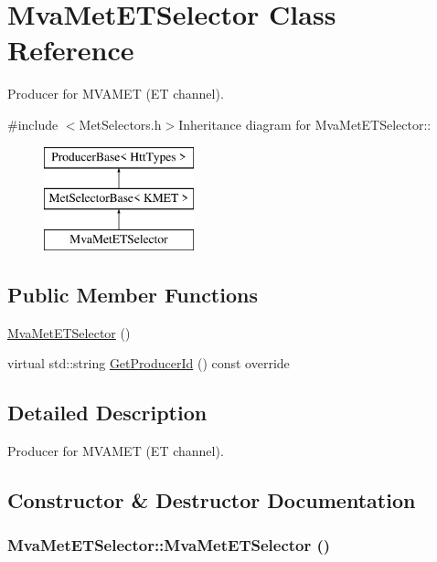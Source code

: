 \hypertarget{classMvaMetETSelector}{
\section{MvaMetETSelector Class Reference}
\label{classMvaMetETSelector}
}


Producer for MVAMET (ET channel).  


{\ttfamily \#include $<$MetSelectors.h$>$}Inheritance diagram for MvaMetETSelector::\begin{figure}[H]
\begin{center}
\leavevmode
\includegraphics[height=3cm]{classMvaMetETSelector}
\end{center}
\end{figure}
\subsection*{Public Member Functions}
\begin{DoxyCompactItemize}
\item 
\hyperlink{classMvaMetETSelector_afe22d385da68fb3ebd28bea8a81d9491}{MvaMetETSelector} ()
\item 
virtual std::string \hyperlink{classMvaMetETSelector_aa0bf0e0f682f9efc2e4b7bf9ae026a5a}{GetProducerId} () const override
\end{DoxyCompactItemize}


\subsection{Detailed Description}
Producer for MVAMET (ET channel). 

\subsection{Constructor \& Destructor Documentation}
\hypertarget{classMvaMetETSelector_afe22d385da68fb3ebd28bea8a81d9491}{
\subsubsection[{MvaMetETSelector}]{\setlength{\rightskip}{0pt plus 5cm}MvaMetETSelector::MvaMetETSelector ()}}
\label{classMvaMetETSelector_afe22d385da68fb3ebd28bea8a81d9491}


